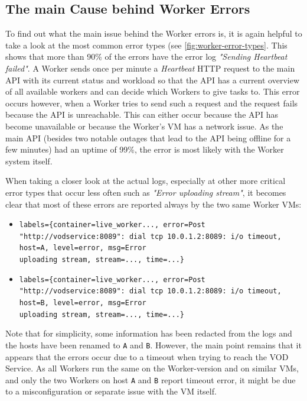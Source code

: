 \subsection{The main Cause behind Worker Errors}

To find out what the main issue behind the Worker errors is, it is again helpful to take a look at the most common error types (see \autoref{fig:worker-error-types}. This shows that more than 90\% of the errors have the error log \textit{"Sending Heartbeat failed"}. A Worker sends once per minute a \textit{Heartbeat} HTTP request to the main \ac{API} with its current status and workload so that the \ac{API} has a current overview of all available workers and can decide which Workers to give tasks to. This error occurs however, when a Worker tries to send such a request and the request fails because the \ac{API} is unreachable. This can either occur because the \ac{API} has become unavailable or because the Worker's \ac{VM} has a network issue. As the main \ac{API} (besides two notable outages that lead to the API being offline for a few minutes) had an uptime of 99\%, the error is most likely with the Worker system itself. 

When taking a closer look at the actual logs, especially at other more critical error types that occur less often such as \textit{"Error uploading stream"}, it becomes clear that most of these errors are reported always by the two same Worker \ac{VM}s:

\begin{itemize}
    \item \texttt{labels=\{container=live\_worker..., error=Post "http://vodservice:8089": dial tcp 10.0.1.2:8089: i/o timeout, host=A, level=error, msg=Error\\ uploading stream, stream=..., time=...\}}

    \item \texttt{labels=\{container=live\_worker..., error=Post "http://vodservice:8089": dial tcp 10.0.1.2:8089: i/o timeout, host=B, level=error, msg=Error\\ uploading stream, stream=..., time=...\}}
\end{itemize}

Note that for simplicity, some information has been redacted from the logs and the hosts have been renamed to \texttt{A} and \texttt{B}. However, the main point remains that it appears that the errors occur due to a timeout when trying to reach the VOD Service. As all Workers run the same on the Worker-version and on similar \ac{VM}s, and only the two Workers on host \texttt{A} and \texttt{B} report timeout error, it might be due to a misconfiguration or separate issue with the \ac{VM} itself. 

